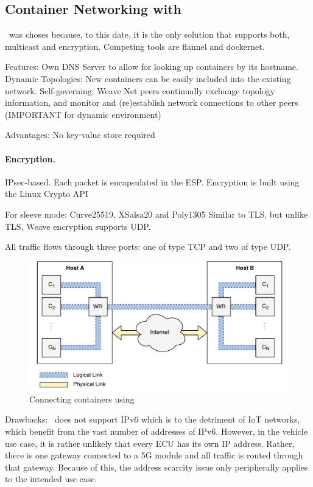 
\subsection{Container Networking with \wnet}

\wnet\ was choses because, to this date, it is the only solution that supports both, multicast and encryption. Competing tools are flannel and dockernet.

Features: Own DNS Server to allow for looking up containers by its hostname. Dynamic Topologies: New containers can be easily included into the existing network. Self-governing: Weave Net peers continually exchange topology information, and monitor and (re)establish network connections to other peers (IMPORTANT for dynamic environment)

Advantages: No key-value store required

\paragraph{Encryption.} 
IPsec-based. Each packet is encapsulated in the ESP. Encryption is built using the Linux Crypto API

For sleeve mode:
Curve25519, XSalsa20 and Poly1305
Similar to TLS, but unlike TLS, Weave encryption supports UDP.


All traffic flows through three ports: one of type TCP and two of type UDP.

\begin{figure}[htpb]
  \centering
  \includegraphics[width=\textwidth]{figures/sdn.pdf}
  \caption[SDN]{Connecting containers using \wnet }\label{fig:weave}
\end{figure}

Drawbacks: \wnet\ does not support IPv6 which is to the detriment of IoT networks, which benefit from the vast number of addresses of IPv6. However, in the vehicle use case, it is rather unlikely that every ECU has its own IP address. Rather, there is one gateway connected to a 5G module and all traffic is routed through that gateway. Because of this, the address scarcity issue only peripherally applies to the intended use case.